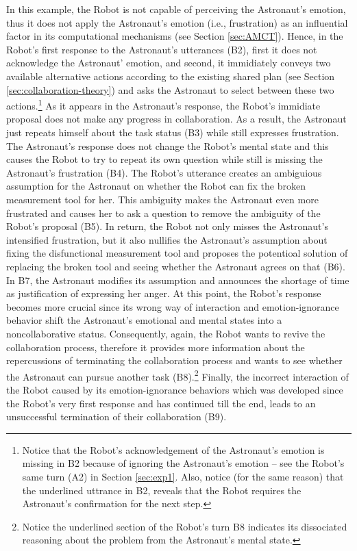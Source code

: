 In this example, the Robot is not capable of perceiving the Astronaut's emotion,
thus it does not apply the Astronaut's emotion (i.e., frustration) as an
influential factor in its computational mechanisms (see Section \ref{sec:AMCT}).
Hence, in the Robot's first response to the Astronaut's utterances (B2), first
it does not acknowledge the Astronaut' emotion, and second, it immidiately
conveys two available alternative actions according to the existing shared plan
(see Section \ref{sec:collaboration-theory}) and asks the Astronaut to select
between these two actions.\footnote{Notice that the Robot's acknowledgement of
the Astronaut's emotion is missing in B2 because of ignoring the Astronaut's
emotion -- see the Robot's same turn (A2) in Section \ref{sec:exp1}. Also,
notice (for the same reason) that the underlined uttrance in B2, reveals that
the Robot requires the Astronaut's confirmation for the next step.} As it
appears in the Astronaut's response, the Robot's immidiate proposal does not
make any progress in collaboration. As a result, the Astronaut just repeats
himself about the task status (B3) while still expresses frustration. The
Astronaut's response does not change the Robot's mental state and this causes
the Robot to try to repeat its own question while still is missing the
Astronaut's frustration (B4). The Robot's utterance creates an ambiguious
assumption for the Astronaut on whether the Robot can fix the broken measurement
tool for her. This ambiguity makes the Astronaut even more frustrated and causes
her to ask a question to remove the ambiguity of the Robot's proposal (B5). In
return, the Robot not only misses the Astronaut's intensified frustration, but
it also nullifies the Astronaut's assumption about fixing the disfunctional
measurement tool and proposes the potentioal solution of replacing the broken
tool and seeing whether the Astronaut agrees on that (B6). In B7, the Astronaut
modifies its assumption and announces the shortage of time as justification of
expressing her anger. At this point, the Robot's response becomes more crucial
since its wrong way of interaction and emotion-ignorance behavior shift the
Astronaut's emotional and mental states into a noncollaborative status.
Consequently, again, the Robot wants to revive the collaboration process,
therefore it provides more information about the repercussions of terminating
the collaboration process and wants to see whether the Astronaut can pursue
another task (B8).\footnote{Notice the underlined section of the Robot's turn
B8 indicates its dissociated reasoning about the problem from the Astronaut's
mental state.} Finally, the incorrect interaction of the Robot caused by its
emotion-ignorance behaviors which was developed since the Robot's very first
response and has continued till the end, leads to an unsuccessful termination of
their collaboration (B9).\\

